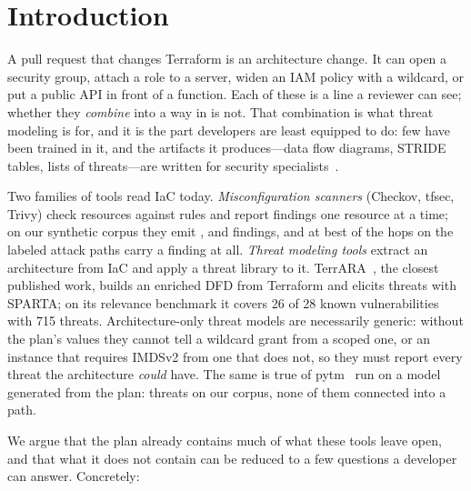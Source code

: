 \documentclass[sigconf,review,anonymous]{acmart}
\begin{document}
\section{Introduction}

A pull request that changes Terraform is an architecture change. It can open a security group, attach a role to a server,
widen an IAM policy with a wildcard, or put a public API in front of a function. Each of these is a line a reviewer can see;
whether they \emph{combine} into a way in is not. That combination is what threat modeling is for, and it is the part
developers are least equipped to do: few have been trained in it, and the artifacts it produces---data flow diagrams,
STRIDE tables, lists of threats---are written for security specialists~\cite{shostack2014threat,tahaei2019survey}.

Two families of tools read IaC today. \emph{Misconfiguration scanners} (Checkov, tfsec, Trivy) check resources against
rules and report findings one resource at a time; on our synthetic corpus they emit \NumTOneCheckov, \NumTOneTfsec and
\NumTOneTrivy findings, and at best \NumTOneHopTfsec of the hops on the labeled attack paths carry a finding at all.
\emph{Threat modeling tools} extract an architecture from IaC and apply a threat library to it. TerrARA~\cite{tran2025terrara},
the closest published work, builds an enriched DFD from Terraform and elicits threats with SPARTA; on its relevance benchmark it
covers 26 of 28 known vulnerabilities with 715 threats. Architecture-only threat models are necessarily generic: without the
plan's values they cannot tell a wildcard grant from a scoped one, or an instance that requires IMDSv2 from one that does not,
so they must report every threat the architecture \emph{could} have. The same is true of pytm~\cite{pytm} run on a model
generated from the plan: \NumTOnePytmOnly threats on our corpus, none of them connected into a path.

We argue that the plan already contains much of what these tools leave open, and that what it does not contain can be
reduced to a few questions a developer can answer. Concretely:
\end{document}
